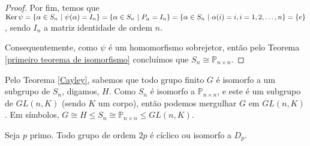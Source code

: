 \begin{proof}
		\par\vspace{0.3cm} Por fim, temos que $\operatorname{Ker}\psi = \{ \alpha\in S_n \ | \ \psi(\alpha) = I_n \} 
		= \{ \alpha\in S_n \ | \ P_{\alpha} = I_n \} = \{ \alpha\in S_n \ | \ \alpha(i) = i, i=1,2,\dots,n \} = \{e\}$,
		sendo $I_n$ a matriz identidade de ordem $n$.
		
		\par\vspace{0.3cm} Consequentemente, como $\psi$ é um homomorfismo sobrejetor, então pelo 
		Teorema \ref{primeiro teorema de isomorfismo} concluímos que $S_n\cong\mathbb{P}_{n\times n}$.
	\end{proof}
	\begin{remark}
		Pelo Teorema \ref{Cayley}, sabemos que todo grupo finito $G$ é isomorfo a um subgrupo de $S_n$, 
		digamos, $H$. Como $S_n$ é isomorfo a $\mathbb{P}_{n\times n}$, e este é um subgrupo de $GL(n,K)$ 
		(sendo $K$ um corpo), então podemos mergulhar $G$ em $GL(n,K)$. Em símbolos, 
		$G\cong H\leq S_n\cong\mathbb{P}_{n\times n}\leq GL(n,K)$.
	\end{remark}
	\begin{lemma}
	\label{grupos de ordem 2p}
		Seja $p$ primo. Todo grupo de ordem $2p$ é cíclico ou isomorfo a $D_p$.
	\end{lemma}
